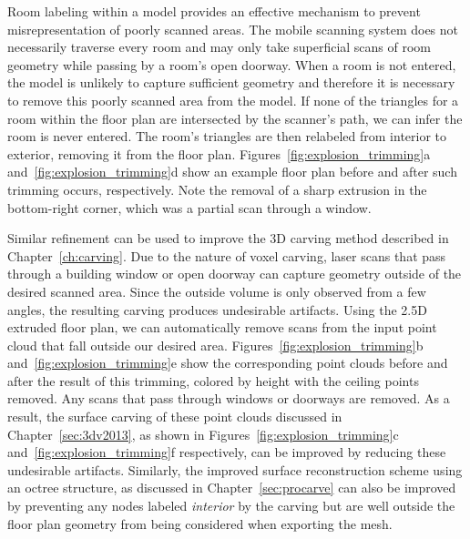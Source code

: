 \documentclass[12pt,onecolumn,oneside]{book}
\begin{document}
Room labeling within a model provides an effective mechanism to prevent misrepresentation of poorly scanned areas.  The mobile scanning system does not necessarily traverse every room and may only take superficial scans of room geometry while passing by a room's open doorway.  When a room is not entered, the model is unlikely to capture sufficient geometry and therefore it is necessary to remove this poorly scanned area from the model.  If none of the triangles for a room within the floor plan are intersected by the scanner's path, we can infer the room is never entered.  The room's triangles are then relabeled from interior to exterior, removing it from the floor plan.  Figures~\ref{fig:explosion_trimming}a and~\ref{fig:explosion_trimming}d show an example floor plan before and after such trimming occurs, respectively.  Note the removal of a sharp extrusion in the bottom-right corner, which was a partial scan through a window.

Similar refinement can be used to improve the 3D carving method described in Chapter~\ref{ch:carving}.  Due to the nature of voxel carving, laser scans that pass through a building window or open doorway can capture geometry outside of the desired scanned area.  Since the outside volume is only observed from a few angles, the resulting carving produces undesirable artifacts.  Using the 2.5D extruded floor plan, we can automatically remove scans from the input point cloud that fall outside our desired area.  Figures~\ref{fig:explosion_trimming}b and~\ref{fig:explosion_trimming}e show the corresponding point clouds before and after the result of this trimming, colored by height with the ceiling points removed.  Any scans that pass through windows or doorways are removed.  As a result, the surface carving of these point clouds discussed in Chapter~\ref{sec:3dv2013}, as shown in Figures~\ref{fig:explosion_trimming}c and~\ref{fig:explosion_trimming}f respectively, can be improved by reducing these undesirable artifacts.  Similarly, the improved surface reconstruction scheme using an octree structure, as discussed in Chapter~\ref{sec:procarve} can also be improved by preventing any nodes labeled {\it interior} by the carving but are well outside the floor plan geometry from being considered when exporting the mesh.
\end{document}
